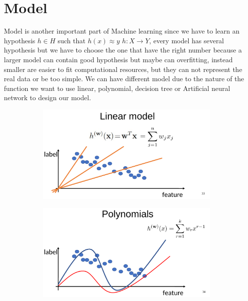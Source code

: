 \section{Model}
Model is another important part of Machine learning since we have to learn an hypothesis $ h \in H$ such that $h(x)\approx y$ \quad $h: X \rightarrow Y $, every model has several hypothesis but we have to choose the one that have the right number because a larger model can contain good hypothesis but maybe can overfitting, instead smaller are easier to fit computational resources, but they can not represent the real data or be too simple.
We can have different model due to the nature of the function we want to use linear, polynomial, decision tree or Artificial neural network to design our model.
\begin{figure}[H]
\centering
    \begin{subfigure}{.4\textwidth}
        \centering
        \includegraphics[width=1\linewidth]{images/3Comp/3comp2.png}
        \caption{}
        \label{fig:sub1}
    \end{subfigure}
    \begin{subfigure}{.4 \textwidth}
        \centering
        \includegraphics[width=1\linewidth]{images/3Comp/3comp3.png}
        \caption{}
        \label{fig:sub1}
    \end{subfigure}
    \caption{}
\end{figure}
